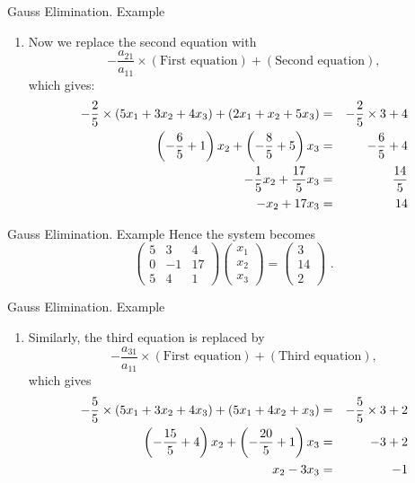 \documentclass[11pt]{beamer}
\begin{document}
\begin{frame}[fragile]{Gauss Elimination. Example}
\begin{enumerate}\addtocounter{enumi}{1}
\item Now we replace the second equation with
\begin{equation}
-\frac{a_{21}}{a_{11}} \times (\text{First equation}) + (\text{Second equation}),
\end{equation}
which gives:
\begin{eqnarray}
-\frac{2}{5} \times (5x_1 + 3x_2 + 4x_3) + (2x_1 + x_2 +5x_3) &=& -\frac{2}{5} \times 3 +4 \notag \\
\left(-\frac{6}{5} + 1 \right)x_2  + \left(-\frac{8}{5} + 5 \right)x_3 &=& -\frac{6}{5}  +4 \notag \\
-\frac{1}{5} x_2  + \frac{17}{5} x_3 &=& \frac{14}{5} \notag \\
- x_2  + 17 x_3 &=& 14
\end{eqnarray}
\end{enumerate}
\end{frame}

\begin{frame}[fragile]{Gauss Elimination. Example}
Hence the system becomes 
\begin{equation}
\begin{pmatrix}
5&3&4\\
0&-1&17\\
5&4&1
\end{pmatrix}
\begin{pmatrix} 
x_1\\ x_2\\ x_3  
\end{pmatrix}
= \begin{pmatrix}3\\ 14 \\2\end{pmatrix}\,\,.
\end{equation}
\end{frame}

\begin{frame}[fragile]{Gauss Elimination. Example}
\begin{enumerate}\addtocounter{enumi}{1}
\item Similarly, the third equation is replaced by
\begin{equation}
-\frac{a_{31}}{a_{11}} \times (\text{First equation}) + (\text{Third equation}),
\end{equation}
which gives
\begin{eqnarray}
-\frac{5}{5} \times (5x_1 + 3x_2 + 4x_3) + (5x_1 + 4x_2 +x_3) &=& -\frac{5}{5} \times 3 + 2  \notag \\
\left(-\frac{15}{5} + 4 \right)x_2  + \left(-\frac{20}{5} + 1 \right)x_3 &=& -3 + 2 \notag \\
 x_2  - 3 x_3 &=& -1 
\end{eqnarray}
\end{enumerate}
\end{frame}
\end{document}
